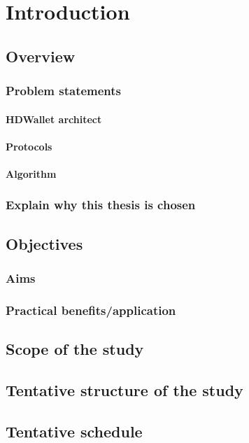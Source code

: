 \chapter{Introduction} \label{Introduction}
\minitoc

\section{Overview}

\subsection{Problem statements}

\subsubsection{HDWallet architect}

\subsubsection{Protocols}

\subsubsection{Algorithm}

\subsection{Explain why this thesis is chosen}

\section{Objectives}

\subsection{Aims}

\subsection{Practical benefits/application}

\section{Scope of the study}

\section{Tentative structure of the study}

\section{Tentative schedule}